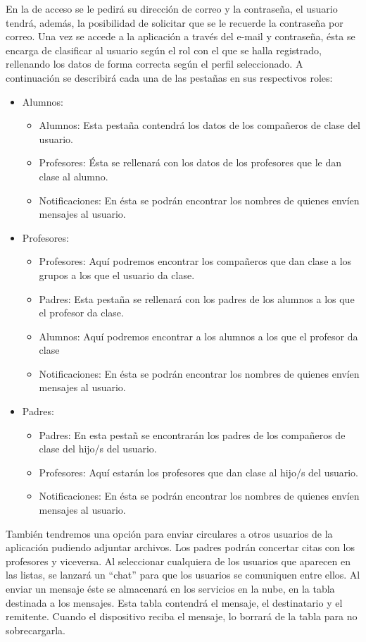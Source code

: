 	En la de acceso se le pedirá su dirección de correo y la contraseña, el usuario tendrá, además, la posibilidad de solicitar que se le recuerde la contraseña por correo.
	\bigskip
	Una vez se accede a la aplicación a través del e-mail y contraseña, ésta se encarga de clasificar al usuario según el rol con el que se halla registrado, rellenando los datos de forma correcta según el perfil seleccionado. A continuación se describirá cada una de las pestañas en sus respectivos roles:
	\bigskip
	\begin{itemize}
		\item Alumnos:
			\begin{itemize}
				\item Alumnos: Esta pestaña contendrá los datos de los compañeros de clase del usuario.
				\item Profesores: Ésta se rellenará con los datos de los profesores que le dan clase al alumno.
				\item Notificaciones: En ésta se podrán encontrar los nombres de quienes envíen mensajes al usuario.
			\end{itemize}
		\item Profesores:
			\begin{itemize}
				\item Profesores: Aquí podremos encontrar los compañeros que dan clase a los grupos a los que el usuario da clase.
				\item Padres: Esta pestaña se rellenará con los padres de los alumnos a los que el profesor da clase.
				\item Alumnos: Aquí podremos encontrar a los alumnos a los que el profesor da clase
				\item Notificaciones: En ésta se podrán encontrar los nombres de quienes envíen mensajes al usuario.
			\end{itemize}
		\item Padres:
			\begin{itemize}
				\item Padres: En esta pestañ se encontrarán los padres de los compañeros de clase del hijo/s del usuario.
				\item Profesores: Aquí estarán los profesores que dan clase al hijo/s del usuario.
				\item Notificaciones: En ésta se podrán encontrar los nombres de quienes envíen mensajes al usuario.
			\end{itemize}
	\end{itemize}
									
	También tendremos una opción para enviar circulares a otros usuarios de la aplicación pudiendo adjuntar archivos. Los padres podrán concertar citas con los profesores y viceversa.
	Al seleccionar cualquiera de los usuarios que aparecen en las listas, se lanzará un ``chat'' para que los usuarios se comuniquen entre ellos. Al enviar un mensaje éste se almacenará en los servicios en la nube, en la tabla destinada a los mensajes. Esta tabla contendrá el mensaje, el destinatario y el remitente. Cuando el dispositivo reciba el mensaje, lo borrará de la tabla para no sobrecargarla.
	
